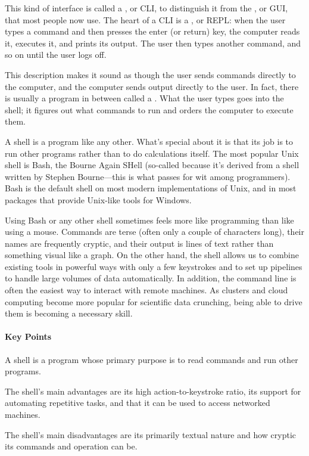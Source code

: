 \documentclass{book}
\begin{document}
This kind of interface is called a , or CLI, to distinguish it from the
, or GUI, that most people now
use. The heart of a CLI is a , or REPL: when the user types a command and then presses the enter
(or return) key, the computer reads it, executes it, and prints its
output. The user then types another command, and so on until the user
logs off.

This description makes it sound as though the user sends commands
directly to the computer, and the computer sends output directly to the
user. In fact, there is usually a program in between called a
. What the user types goes into the
shell; it figures out what commands to run and orders the computer to
execute them.

A shell is a program like any other. What's special about it is that its
job is to run other programs rather than to do calculations itself. The
most popular Unix shell is Bash, the Bourne Again SHell (so-called
because it's derived from a shell written by Stephen Bourne---this is
what passes for wit among programmers). Bash is the default shell on
most modern implementations of Unix, and in most packages that provide
Unix-like tools for Windows.

Using Bash or any other shell sometimes feels more like programming than
like using a mouse. Commands are terse (often only a couple of
characters long), their names are frequently cryptic, and their output
is lines of text rather than something visual like a graph. On the other
hand, the shell allows us to combine existing tools in powerful ways
with only a few keystrokes and to set up pipelines to handle large
volumes of data automatically. In addition, the command line is often
the easiest way to interact with remote machines. As clusters and cloud
computing become more popular for scientific data crunching, being able
to drive them is becoming a necessary skill.

\mbox{}\paragraph{Key Points}

\begin{swcitemize}
\item
  A shell is a program whose primary purpose is to read commands and run
  other programs.
\item
  The shell's main advantages are its high action-to-keystroke ratio,
  its support for automating repetitive tasks, and that it can be used
  to access networked machines.
\item
  The shell's main disadvantages are its primarily textual nature and
  how cryptic its commands and operation can be.
\end{swcitemize}
\end{document}
